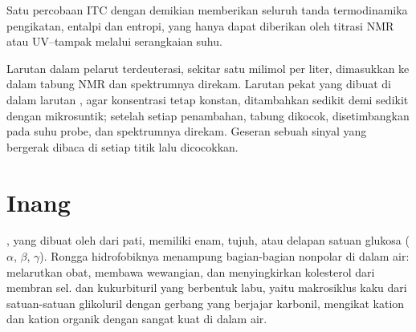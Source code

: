 Satu percobaan ITC dengan demikian memberikan seluruh tanda termodinamika
pengikatan, entalpi dan entropi, yang hanya dapat diberikan oleh titrasi NMR atau UV--tampak
melalui serangkaian suhu.

\begin{inthelab}
Larutan  dalam pelarut terdeuterasi, sekitar satu milimol per liter,
dimasukkan ke dalam tabung NMR dan spektrumnya direkam. Larutan pekat
 yang dibuat di dalam larutan , agar konsentrasi  tetap
konstan, ditambahkan sedikit demi sedikit dengan mikrosuntik; setelah setiap penambahan,
tabung dikocok, disetimbangkan pada suhu probe, dan spektrumnya
direkam. Geseran sebuah sinyal  yang bergerak dibaca di setiap titik lalu
dicocokkan.
\end{inthelab}

\section{Inang}

, yang dibuat oleh  dari pati, memiliki enam, tujuh, atau delapan satuan
glukosa ($\alpha$, $\beta$, $\gamma$). Rongga hidrofobiknya menampung bagian-bagian nonpolar  di dalam
air:  melarutkan obat, membawa wewangian, dan menyingkirkan kolesterol dari
membran sel.  dan kukurbituril yang berbentuk labu, yaitu
makrosiklus kaku dari satuan-satuan glikoluril dengan gerbang yang berjajar karbonil, mengikat kation dan
kation organik dengan sangat kuat di dalam air.

